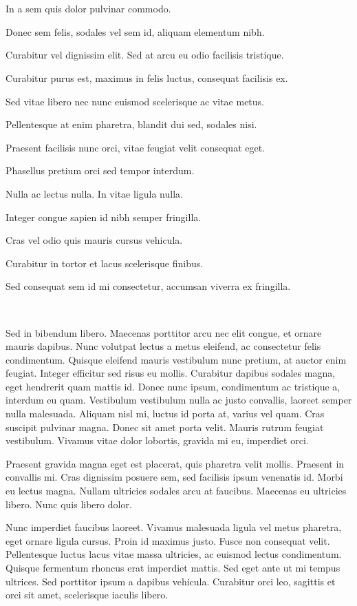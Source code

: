 \documentclass[
]{book}
\begin{document}
~

~

In a sem quis dolor pulvinar commodo.

Donec sem felis, sodales vel sem id, aliquam elementum nibh.

Curabitur vel dignissim elit. Sed at arcu eu odio facilisis tristique.

Curabitur purus est, maximus in felis luctus, consequat facilisis ex.

Sed vitae libero nec nunc euismod scelerisque ac vitae metus.

Pellentesque at enim pharetra, blandit dui sed, sodales nisi.

Praesent facilisis nunc orci, vitae feugiat velit consequat eget.

Phasellus pretium orci sed tempor interdum.

Nulla ac lectus nulla. In vitae ligula nulla.

Integer congue sapien id nibh semper fringilla.

Cras vel odio quis mauris cursus vehicula.

Curabitur in tortor et lacus scelerisque finibus.

Sed consequat sem id mi consectetur, accumsan viverra ex fringilla.

~

Sed in bibendum libero. Maecenas porttitor arcu nec elit congue, et ornare mauris dapibus. Nunc volutpat lectus a metus eleifend, ac consectetur felis condimentum. Quisque eleifend mauris vestibulum nunc pretium, at auctor enim feugiat. Integer efficitur sed risus eu mollis. Curabitur dapibus sodales magna, eget hendrerit quam mattis id. Donec nunc ipsum, condimentum ac tristique a, interdum eu quam. Vestibulum vestibulum nulla ac justo convallis, laoreet semper nulla malesuada. Aliquam nisl mi, luctus id porta at, varius vel quam. Cras suscipit pulvinar magna. Donec sit amet porta velit. Mauris rutrum feugiat vestibulum. Vivamus vitae dolor lobortis, gravida mi eu, imperdiet orci.

Praesent gravida magna eget est placerat, quis pharetra velit mollis. Praesent in convallis mi. Cras dignissim posuere sem, sed facilisis ipsum venenatis id. Morbi eu lectus magna. Nullam ultricies sodales arcu at faucibus. Maecenas eu ultricies libero. Nunc quis libero dolor.

Nunc imperdiet faucibus laoreet. Vivamus malesuada ligula vel metus pharetra, eget ornare ligula cursus. Proin id maximus justo. Fusce non consequat velit. Pellentesque luctus lacus vitae massa ultricies, ac euismod lectus condimentum. Quisque fermentum rhoncus erat imperdiet mattis. Sed eget ante ut mi tempus ultrices. Sed porttitor ipsum a dapibus vehicula. Curabitur orci leo, sagittis et orci sit amet, scelerisque iaculis libero.
\end{document}
